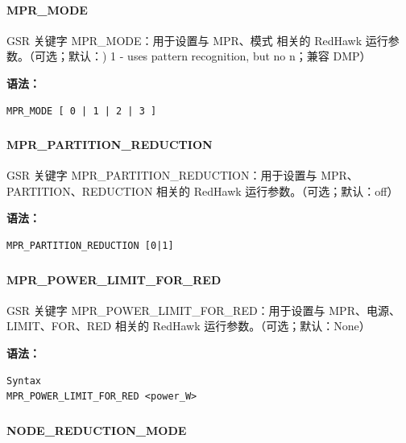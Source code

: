 \paragraph*{MPR_MODE}

GSR 关键字 MPR_MODE：用于设置与 MPR、模式 相关的 RedHawk 运行参数。（可选；默认：) 1 - uses pattern recognition, but no n；兼容 DMP）

\textbf{语法：}
\begin{lstlisting}
MPR_MODE [ 0 | 1 | 2 | 3 ]
\end{lstlisting}

\subsubsection{}
\paragraph*{MPR_PARTITION_REDUCTION}

GSR 关键字 MPR_PARTITION_REDUCTION：用于设置与 MPR、PARTITION、REDUCTION 相关的 RedHawk 运行参数。（可选；默认：off）

\textbf{语法：}
\begin{lstlisting}
MPR_PARTITION_REDUCTION [0|1]
\end{lstlisting}

\subsubsection{}
\paragraph*{MPR_POWER_LIMIT_FOR_RED}

GSR 关键字 MPR_POWER_LIMIT_FOR_RED：用于设置与 MPR、电源、LIMIT、FOR、RED 相关的 RedHawk 运行参数。（可选；默认：None）

\textbf{语法：}
\begin{lstlisting}
Syntax
MPR_POWER_LIMIT_FOR_RED <power_W>
\end{lstlisting}

\subsubsection{}
\paragraph*{NODE_REDUCTION_MODE}


